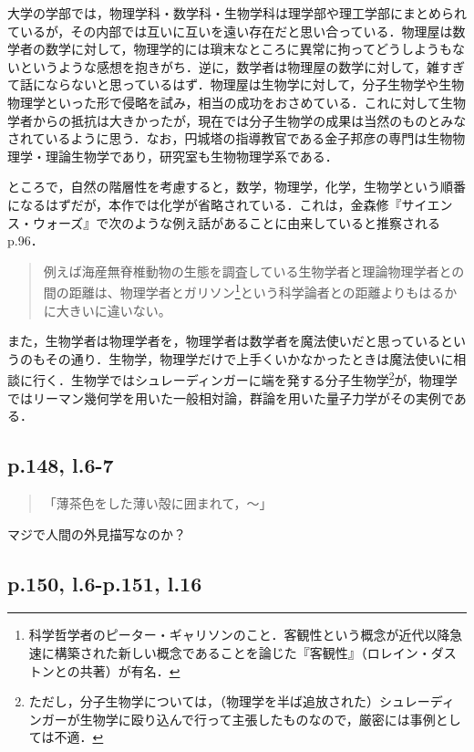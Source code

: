 \documentclass[10pt, a5paper, twoside]{ltjsarticle}
\begin{document}
            大学の学部では，物理学科・数学科・生物学科は理学部や理工学部にまとめられているが，その内部では互いに互いを遠い存在だと思い合っている．物理屋は数学者の数学に対して，物理学的には瑣末なところに異常に拘ってどうしようもないというような感想を抱きがち．逆に，数学者は物理屋の数学に対して，雑すぎて話にならないと思っているはず．物理屋は生物学に対して，分子生物学や生物物理学といった形で侵略を試み，相当の成功をおさめている．これに対して生物学者からの抵抗は大きかったが，現在では分子生物学の成果は当然のものとみなされているように思う．なお，円城塔の指導教官である金子邦彦の専門は生物物理学・理論生物学であり，研究室も生物物理学系である．

            ところで，自然の階層性を考慮すると，数学，物理学，化学，生物学という順番になるはずだが，本作では化学が省略されている．これは，金森修『サイエンス・ウォーズ』で次のような例え話があることに由来していると推察される\cite{kanamori}p.96．

            \begin{quote}
                例えば海産無脊椎動物の生態を調査している生物学者と理論物理学者との間の距離は、物理学者とガリソン\footnote{科学哲学者のピーター・ギャリソンのこと．客観性という概念が近代以降急速に構築された新しい概念であることを論じた『客観性』（ロレイン・ダストンとの共著）\cite{objectibity}が有名．}という科学論者との距離よりもはるかに大きいに違いない。
            \end{quote}

            また，生物学者は物理学者を，物理学者は数学者を魔法使いだと思っているというのもその通り．生物学，物理学だけで上手くいかなかったときは魔法使いに相談に行く．生物学ではシュレーディンガーに端を発する分子生物学\footnote{ただし，分子生物学については，（物理学を半ば追放された）シュレーディンガーが生物学に殴り込んで行って主張したものなので，厳密には事例としては不適．}が，物理学ではリーマン幾何学を用いた一般相対論，群論を用いた量子力学がその実例である．

        \subsection{p.148, l.6-7}

            \begin{quote}
                「薄茶色をした薄い殻に囲まれて，〜」
            \end{quote}

            マジで人間の外見描写なのか？

        \subsection{p.150, l.6-p.151, l.16}
\end{document}
